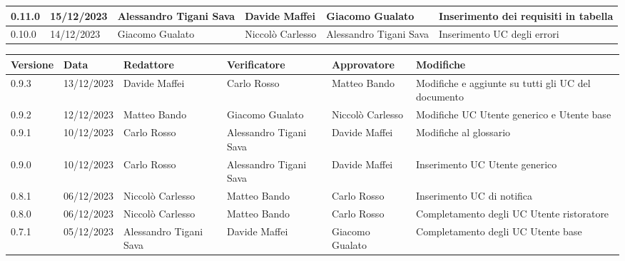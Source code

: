 \begin{table}[H]
\begin{tabularx}{\textwidth}{X|X|X|X|X|X}
		\hline
		0.11.0                & 15/12/2023           & Alessandro Tigani Sava & Davide Maffei          & Giacomo Gualato        & Inserimento dei requisiti in tabella                                     \\
		\hline
		0.10.0                & 14/12/2023           & Giacomo Gualato        & Niccolò Carlesso       & Alessandro Tigani Sava & Inserimento UC degli errori                                     \\
		\bottomrule
	\end{tabularx}
\end{table}


\begin{table}[H]
	\centering
	\fontsize{10}{12}\selectfont
	\begin{tabularx}{\textwidth}{X|X|X|X|X|X}
		\textbf{Versione}     & \textbf{Data}        & \textbf{Redattore}     &
		\textbf{Verificatore} & \textbf{Approvatore} & \textbf{Modifiche}                                                                                                    \\
		\toprule
		0.9.3                 & 13/12/2023           & Davide Maffei          & Carlo Rosso            & Matteo Bando       	& Modifiche e aggiunte su tutti gli UC del documento                                   \\
		\hline
		0.9.2                 & 12/12/2023           & Matteo Bando           & Giacomo Gualato        & Niccolò Carlesso       & Modifiche UC Utente generico e Utente base                                     \\
		\hline
		0.9.1                 & 10/12/2023           & Carlo Rosso            & Alessandro Tigani Sava & Davide Maffei          & Modifiche al glossario                                     \\
		\hline
		0.9.0                 & 10/12/2023           & Carlo Rosso            & Alessandro Tigani Sava & Davide Maffei          & Inserimento UC Utente generico                             \\
		\hline
		0.8.1                 & 06/12/2023           & Niccolò Carlesso       & Matteo Bando           & Carlo Rosso            & Inserimento UC di notifica                                 \\
		\hline
		0.8.0                 & 06/12/2023           & Niccolò Carlesso       & Matteo Bando           & Carlo Rosso            & Completamento degli UC Utente ristoratore                  \\
		\hline
		0.7.1                 & 05/12/2023           & Alessandro Tigani Sava & Davide Maffei          & Giacomo Gualato        & Completamento degli UC Utente base                         \\

\end{tabularx}
\end{table}
